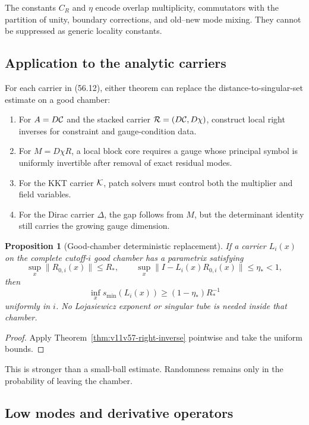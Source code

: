 \documentclass[11pt]{article}
\newtheorem{proposition}[theorem]{Proposition}
\begin{document}
The constants \(C_R\) and \(\eta\) encode overlap multiplicity,
commutators with the partition of unity, boundary corrections, and
old--new mode mixing.  They cannot be suppressed as generic locality
constants.

\subsection{Application to the analytic carriers}

For each carrier in (56.12), either theorem can replace the
distance-to-singular-set estimate on a good chamber:

\begin{enumerate}
\item For \(A=D{\cal C}\) and the stacked carrier
\({\cal R}=(D{\cal C},D\chi)\), construct local right inverses for
constraint and gauge-condition data.
\item For \(M=D\chi R\), a local block core requires a gauge whose
principal symbol is uniformly invertible after removal of exact
residual modes.
\item For the KKT carrier \({\cal K}\), patch solvers must control both
the multiplier and field variables.
\item For the Dirac carrier \(\Delta\), the gap follows from \(M\), but
the determinant identity still carries the growing gauge dimension.
\end{enumerate}

\begin{proposition}[Good-chamber deterministic replacement]
\label{prop:v11v57-replacement}
If a carrier \(L_i(x)\) on the complete cutoff-\(i\) good chamber has
a parametrix satisfying
\[
             \sup_x\lVert R_{0,i}(x)\rVert\le R_*,
 \qquad
             \sup_x\lVert I-L_i(x)R_{0,i}(x)\rVert\le\eta_*<1,\tag{57.15}
\]
then
\[
                 \inf_xs_{\min}(L_i(x))
                    \ge(1-\eta_*)R_*^{-1}                    \tag{57.16}
\]
uniformly in \(i\).  No Lojasiewicz exponent or singular tube is needed
inside that chamber.
\end{proposition}

\begin{proof}
Apply Theorem~\ref{thm:v11v57-right-inverse} pointwise and take the
uniform bounds.
\end{proof}

This is stronger than a small-ball estimate.  Randomness remains only
in the probability of leaving the chamber.

\subsection{Low modes and derivative operators}
\end{document}
